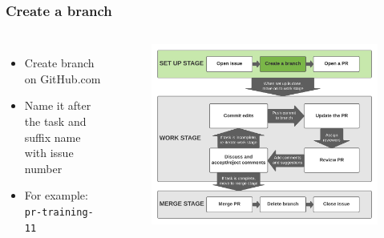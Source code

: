 \documentclass[aspectratio=169]{beamer} %
\begin{document}
\begin{frame}
	\frametitle{Create a branch}
	\begin{columns}[c]
		
		\begin{itemize}
			\setlength\itemsep{1em}
			\item Create branch on GitHub.com
			\item Name it after the task and suffix name with issue number
			\item For example: \texttt{pr-training-11}
		\end{itemize}
		
		\vspace{-.75cm}
		\begin{figure}
			\centering
			\includegraphics[width=\textwidth]{./img/branch-pr-merge-cycle-S1-2.png}
		\end{figure}
		
	\end{columns}
\end{frame}
\end{document}
